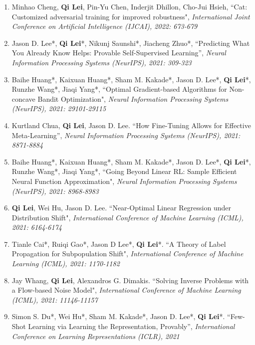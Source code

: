 \documentclass[margin, 10pt]{res} %
\begin{document}
\begin{resume}
\begin{enumerate}
	
\item{Minhao Cheng, \textbf{Qi Lei}, Pin-Yu Chen, Inderjit Dhillon, Cho-Jui Hsieh, ``Cat: Customized adversarial training for improved robustness", \textit{International Joint Conference on Artificial Intelligence (IJCAI), 2022: 673-679}}
	
		\item {Jason D. Lee*, \textbf{Qi Lei}*, Nikunj Saunshi*, Jiacheng Zhuo*, ``Predicting What You Already Know Helps: Provable Self-Supervised Learning”, \textit{Neural Information Processing Systems (NeurIPS), 2021: 309-323}}


\item {Baihe Huang*, Kaixuan Huang*, Sham M. Kakade*, Jason D. Lee*, \textbf{Qi Lei}*, Runzhe Wang*, Jiaqi Yang*,  ``Optimal Gradient-based Algorithms for Non-concave Bandit Optimization", 	\textit{Neural Information Processing Systems (NeurIPS), 2021: 29101-29115} }


\item 	{ Kurtland Chua, \textbf{Qi Lei}, Jason D. Lee. ``How Fine-Tuning Allows for Effective Meta-Learning”, \textit{Neural Information Processing Systems (NeurIPS), 2021: 8871-8884} }



\item {Baihe Huang*, Kaixuan Huang*, Sham M. Kakade*, Jason D. Lee*, \textbf{Qi Lei}*, Runzhe Wang*, Jiaqi Yang*, ``Going Beyond Linear RL: Sample Efficient Neural Function Approximation", \textit{Neural Information Processing Systems (NeurIPS), 2021: 8968-8983} }
	
	
\item{ \textbf{Qi Lei}, Wei Hu, Jason D. Lee.	
``Near-Optimal Linear Regression under Distribution Shift", \textit{ International Conference of Machine Learning (ICML), 2021: 6164-6174}
}	
\item{Tianle Cai*, Ruiqi Gao*, Jason D Lee*, \textbf{Qi Lei}*.  ``A Theory of Label Propagation for Subpopulation Shift", \textit{International Conference of Machine Learning (ICML), 2021: 1170-1182
} }
\item{Jay Whang, \textbf{Qi Lei}, Alexandros G. Dimakis. ``Solving Inverse Problems with a Flow-based Noise Model", \textit{International Conference of Machine Learning (ICML), 2021: 11146-11157
 }}
	\item{Simon S. Du*, Wei Hu*, Sham M. Kakade*, Jason D. Lee*, \textbf{Qi Lei}*. ``Few-Shot Learning via Learning the Representation, Provably'', \textit{International Conference on Learning Representations (ICLR), 2021} }
	

\end{enumerate}
\end{resume}
\end{document}
